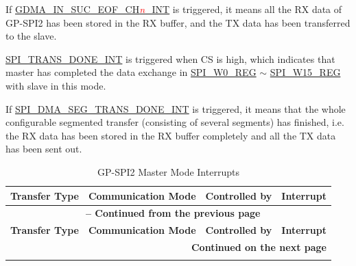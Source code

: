 \documentclass[main\_\_EN.tex]{subfiles}
\begin{document}
\begin{ThreePartTable}

\begin{TableNotes}
    \item[1] If \hyperref[int:GDMAINSUCEOFINT]{GDMA\_IN\_SUC\_EOF\_CH\textcolor{red}{\it{n}}\_INT} is triggered, it means all the RX data of GP-SPI2 has been stored in the RX buffer, and the TX data has been transferred to the slave.
    \item[2] \hyperref[int:SPITRANSDONEINT]{SPI\_TRANS\_DONE\_INT} is triggered when CS is high, which indicates that master has completed the data exchange in \hyperref[regdesc:SPIW0REG]{SPI\_W0\_REG} $\sim$ \hyperref[regdesc:SPIW15REG]{SPI\_W15\_REG}  with slave in this mode.
    \item[3] If \hyperref[int:SPIDMASEGTRANSDONEINT]{SPI\_DMA\_SEG\_TRANS\_DONE\_INT} is triggered, it means that the whole configurable segmented transfer (consisting of several segments) has finished, i.e. the RX data has been stored in the RX buffer completely and all the TX data has been sent out.
\end{TableNotes}

\begin{longtable}[c]{|l|l|l|l|}
\caption{GP-SPI2 Master Mode Interrupts}\label{Table:Mst_Int_Table}
\\\hline
\rowcolor{lightgray}
\textbf{Transfer Type}  & \textbf{Communication Mode} & \textbf{Controlled by} & \textbf{Interrupt} \\\hline
    \endfirsthead
    \multicolumn{4}{c}{\bfseries \tablename\ \thetable{} -- Continued from the previous page }\\\hline
    \rowcolor{lightgray}
    \textbf{Transfer Type}  & \textbf{Communication Mode} & \textbf{Controlled by} & \textbf{Interrupt}\\\hline
    \endhead

    \multicolumn{4}{r}{\textbf{Continued on the next page}} \\
    \endfoot


\end{longtable}
\end{ThreePartTable}
\end{document}

